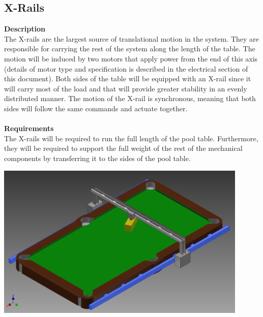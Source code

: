 \documentclass[titlepage]{article}
\begin{document}
\subsection{X-Rails}
\textbf{Description}\\
The X-rails are the largest source of translational motion in the system. They are responsible for carrying the rest of the system along the length of the table. The motion will be induced by two motors that apply power from the end of this axis (details of motor type and specification is described in the electrical section of this document). Both sides of the table will be equipped with an X-rail since it will carry most of the load and that will provide greater stability in an evenly distributed manner. The motion of the X-rail is synchronous, meaning that both sides will follow the same commands and actuate together.\\\\
\textbf{Requirements}\\
The X-rails will be required to run the full length of the pool table. Furthermore, they will be required to support the full weight of the rest of the mechanical components by transferring it to the sides of the pool table.
\begin{center}
	\includegraphics[width = 0.9\textwidth]{xRails1.png}	%
\label{fig:xRailFig}
\end{center}
\end{document}
